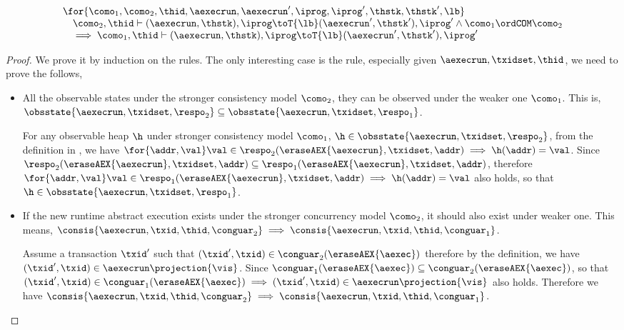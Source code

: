 \begin{lem}
\label{lem:semantics-monotonicity}
\[
\begin{array}{@{}l@{}}
    \for{\como_{1}, \como_{2}, \thid, \aexecrun, \aexecrun', \iprog, \iprog', \thstk, \thstk', \lb}  \\
    \quad \como_{2}, \thid \vdash ( \aexecrun, \thstk ), \iprog \toT{\lb} ( \aexecrun', \thstk' ), \iprog'
    \land \como_{1} \ordCOM \como_{2} \\
    \quad \implies \como_{1}, \thid \vdash ( \aexecrun, \thstk ), \iprog \toT{\lb} ( \aexecrun', \thstk' ), \iprog'
\end{array}
\]
\end{lem}
\begin{proof}
We prove it by induction on the rules.
The only interesting case is the   rule, especially given \( \aexecrun, \txidset, \thid \), we need to prove the follows,
\begin{itemize}
\item All the observable states under the stronger consistency model \( \como_{2} \), they can be observed under the weaker one \( \como_{1} \).
This is, \( \obsstate{\aexecrun, \txidset, \respo_{2}} \subseteq  \obsstate{\aexecrun, \txidset, \respo_{1}} \).

For any observable heap \( \h \) under stronger consistency model \( \como_{1}\), \ie \( \h \in \obsstate{\aexecrun, \txidset, \respo_{2}} \), from the definition in , we have \( \for{\addr, \val}  \val \in \respo_{2}(\eraseAEX{\aexecrun}, \txidset, \addr) \implies \h(\addr) = \val \).
Since \( \respo_{2}(\eraseAEX{\aexecrun}, \txidset, \addr) \subseteq \respo_{1}(\eraseAEX{\aexecrun}, \txidset, \addr) \), therefore \( \for{\addr, \val}  \val \in \respo_{1}(\eraseAEX{\aexecrun}, \txidset, \addr) \implies \h(\addr) = \val \) also holds, so that \( \h \in \obsstate{\aexecrun, \txidset, \respo_{1}} \).

\item If the new runtime abstract execution exists under the stronger concurrency model \( \como_{2} \), it should also exist under weaker one.
This means, \( \consis{\aexecrun, \txid, \thid, \conguar_{2}} \implies \consis{\aexecrun, \txid, \thid, \conguar_{1}} \).

Assume a transaction \( \txid' \) such that \( (\txid', \txid) \in \conguar_{2}(\eraseAEX{\aexec}) \) therefore by the definition, we have \( (\txid', \txid) \in \aexecrun\projection{\vis} \).
Since \( \conguar_{1}(\eraseAEX{\aexec}) \subseteq \conguar_{2}(\eraseAEX{\aexec})\), so that \( (\txid', \txid) \in \conguar_{1}(\eraseAEX{\aexec}) \implies (\txid', \txid) \in \aexecrun\projection{\vis} \) also holds.
Therefore we have \( \consis{\aexecrun, \txid, \thid, \conguar_{2}} \implies \consis{\aexecrun, \txid, \thid, \conguar_{1}} \).
\end{itemize}
\end{proof}

